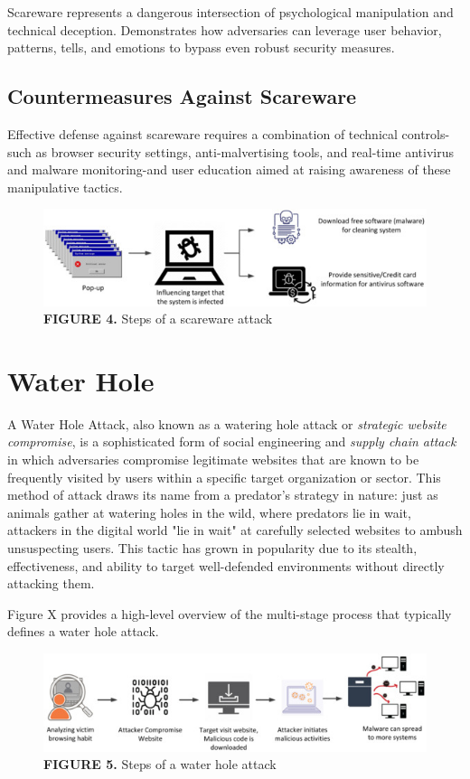 {Scareware represents a dangerous intersection of psychological manipulation and technical deception.  Demonstrates how adversaries can leverage user behavior, patterns, tells, and emotions to bypass even robust security measures.

\subsection{Countermeasures Against Scareware}
Effective defense against scareware requires a combination of technical controls-such as browser security settings, anti-malvertising tools, and real-time antivirus and malware monitoring-and user education aimed at raising awareness of these manipulative tactics.


\begin{figure}
    \centering
    \includegraphics[width=1\linewidth]{scareware.png}
    \caption{\textbf{FIGURE 4. }Steps of a scareware attack}
    \label{fig:placeholder}
\end{figure}

\section{Water Hole}
A Water Hole Attack, also known as a watering hole attack or \textit{strategic website compromise}, is a sophisticated form of social engineering and \textit{supply chain attack} in which adversaries compromise legitimate websites that are known to be frequently visited by users within a specific target organization or sector. This method of attack draws its name from a predator's strategy in nature: just as animals gather at watering holes in the wild, where predators lie in wait, attackers in the digital world "lie in wait" at carefully selected websites to ambush unsuspecting users. This tactic has grown in popularity due to its stealth, effectiveness, and ability to target well-defended environments without directly attacking them.

Figure X provides a high-level overview of the multi-stage process that typically defines a water hole attack.


\begin{figure}
    \centering
    \includegraphics[width=0.75\linewidth]{waterhole.png}
    \caption{\textbf{FIGURE 5. }Steps of a water hole attack}
    \label{fig:placeholder}
\end{figure}

}
